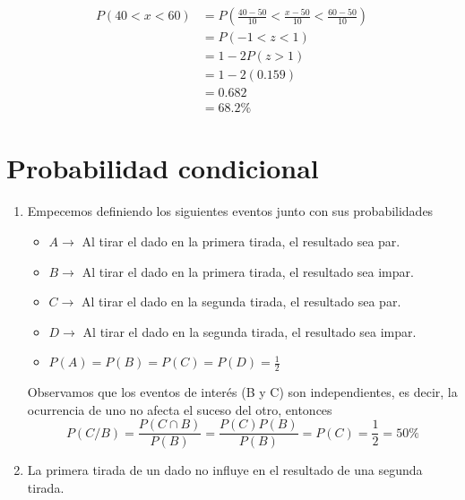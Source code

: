 \documentclass[12pt, letterpaper]{article}
\begin{document}
\begin{enumerate}
\begin{equation*}
    \end{equation*}
    \begin{equation*}
        \begin{aligned}
            P(40 < x < 60)
            & = P(\frac{40-50}{10} < \frac{x-50}{10} < \frac{60-50}{10}) \\
            & = P(-1 < z < 1) \\
            & = 1 - 2P(z > 1) \\
            & = 1 - 2(0.159) \\
            & = 0.682 \\
            & = 68.2\%
        \end{aligned}
    \end{equation*}
\end{enumerate}

\newpage

\section{Probabilidad condicional}
\begin{enumerate}
    \item Empecemos definiendo los siguientes eventos junto con sus probabilidades
    \begin{itemize}
        \item $A \rightarrow $ Al tirar el dado en la primera tirada, el resultado sea par.
        \item $B \rightarrow $ Al tirar el dado en la primera tirada, el resultado sea impar.
        \item $C \rightarrow $ Al tirar el dado en la segunda tirada, el resultado sea par.
        \item $D \rightarrow $ Al tirar el dado en la segunda tirada, el resultado sea impar.
        \item $P(A) = P(B) = P(C) = P(D) = \frac{1}{2}$
    \end{itemize}
    Observamos que los eventos de interés (B y C) son independientes, es decir, la ocurrencia de uno no afecta el suceso del otro, entonces
    \begin{equation*}
        P(C/B) = \frac{P(C \cap B)}{P(B)} = \frac{P(C)P(B)}{P(B)} = P(C) = \frac{1}{2} = 50\%
    \end{equation*}
    \item La primera tirada de un dado no influye en el resultado de una segunda tirada.
\end{enumerate}
\end{document}

